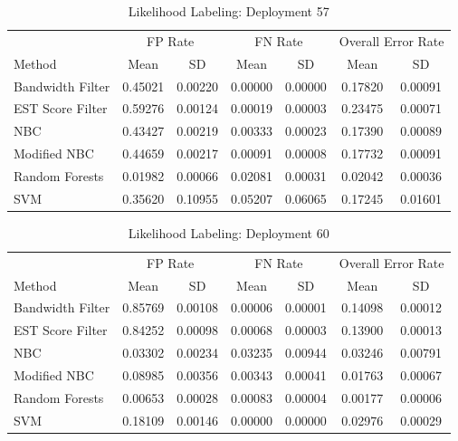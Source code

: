 \documentclass[twoside]{article}
\begin{document}
\begin{table}[H]
\caption{Likelihood Labeling: Deployment 57}
\centering
\begin{tabular}{lcccccc}
\toprule
\multicolumn{1}{c}{ } 
&\multicolumn{2}{c}{FP Rate } 
&\multicolumn{2}{c}{FN Rate } 
&\multicolumn{2}{c}{Overall Error Rate } \\
\cmidrule(r){2-3}
\cmidrule(r){4-5}
\cmidrule(r){6-7}
Method& Mean & SD & Mean & SD & Mean & SD \\
\midrule
Bandwidth Filter & 0.45021 & 0.00220 & 0.00000 & 0.00000 & 0.17820 & 0.00091 \\
EST Score Filter & 0.59276 & 0.00124 & 0.00019 & 0.00003 & 0.23475 & 0.00071 \\
NBC & 0.43427 & 0.00219 & 0.00333 & 0.00023 & 0.17390 & 0.00089 \\
Modified NBC & 0.44659 & 0.00217 & 0.00091 & 0.00008 & 0.17732 & 0.00091 \\
Random Forests & 0.01982 & 0.00066 & 0.02081 & 0.00031 & 0.02042 & 0.00036 \\
SVM & 0.35620 & 0.10955 & 0.05207 & 0.06065 & 0.17245 & 0.01601 \\
\bottomrule
\end{tabular}
\end{table}

\begin{table}[H]
\caption{Likelihood Labeling: Deployment 60}
\centering
\begin{tabular}{lcccccc}
\toprule
\multicolumn{1}{c}{ } 
&\multicolumn{2}{c}{FP Rate } 
&\multicolumn{2}{c}{FN Rate } 
&\multicolumn{2}{c}{Overall Error Rate } \\
\cmidrule(r){2-3}
\cmidrule(r){4-5}
\cmidrule(r){6-7}
Method& Mean & SD & Mean & SD & Mean & SD \\
\midrule
Bandwidth Filter & 0.85769 & 0.00108 & 0.00006 & 0.00001 & 0.14098 & 0.00012 \\
EST Score Filter & 0.84252 & 0.00098 & 0.00068 & 0.00003 & 0.13900 & 0.00013 \\
NBC & 0.03302 & 0.00234 & 0.03235 & 0.00944 & 0.03246 & 0.00791 \\
Modified NBC & 0.08985 & 0.00356 & 0.00343 & 0.00041 & 0.01763 & 0.00067 \\
Random Forests & 0.00653 & 0.00028 & 0.00083 & 0.00004 & 0.00177 & 0.00006 \\
SVM & 0.18109 & 0.00146 & 0.00000 & 0.00000 & 0.02976 & 0.00029 \\
\bottomrule
\end{tabular}
\end{table}
\end{document}
